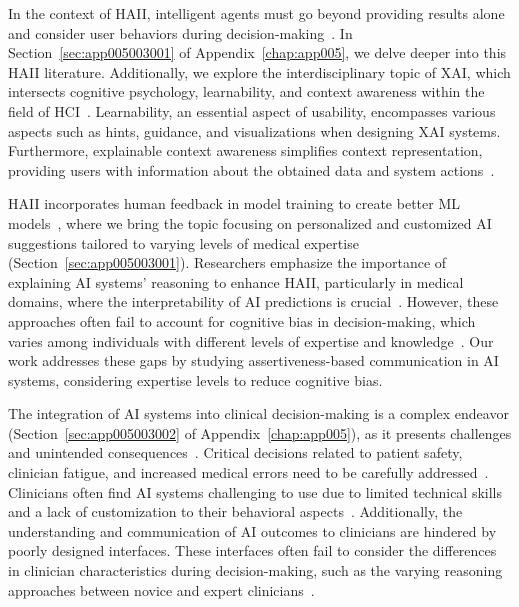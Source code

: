 In the context of \ac{HAII}, intelligent agents must go beyond providing results alone and consider user behaviors during decision-making~\cite{10.1145/3313831.3376807}.
In Section~\ref{sec:app005003001} of Appendix~\ref{chap:app005}, we delve deeper into this \ac{HAII} literature.
Additionally, we explore the interdisciplinary topic of \ac{XAI}, which intersects cognitive psychology, learnability, and context awareness within the field of \ac{HCI}~\cite{doi:10.1073/pnas.1618211113}.
Learnability, an essential aspect of usability, encompasses various aspects such as hints, guidance, and visualizations when designing \ac{XAI} systems\cite{10.1145/3173574.3174156}.
Furthermore, explainable context awareness simplifies context representation, providing users with information about the obtained data and system actions~\cite{10.1145/3313831.3376545}.

\ac{HAII} incorporates human feedback in model training to create better \ac{ML} models~\cite{10.1145/3290605.3300233, 10.1145/3132272.3134111, Kocielnik:2019:YAI:3290605.3300641, aha2017ai}, where we bring the topic focusing on personalized and customized \ac{AI} suggestions tailored to varying levels of medical expertise (Section~\ref{sec:app005003001}).
Researchers emphasize the importance of explaining \ac{AI} systems' reasoning to enhance \ac{HAII}, particularly in medical domains, where the interpretability of \ac{AI} predictions is crucial~\cite{10.1145/3411764.3445717, Rudin2022, Kawamleh2022}.
However, these approaches often fail to account for cognitive bias in decision-making, which varies among individuals with different levels of expertise and knowledge~\cite{https://doi.org/10.1111/nuf.12430, Seidel2021}.
Our work addresses these gaps by studying assertiveness-based communication in \ac{AI} systems, considering expertise levels to reduce cognitive bias.

The integration of \ac{AI} systems into clinical decision-making is a complex endeavor (Section~\ref{sec:app005003002} of Appendix~\ref{chap:app005}), as it presents challenges and unintended consequences~\cite{miller2019intrinsically}.
Critical decisions related to patient safety, clinician fatigue, and increased medical errors need to be carefully addressed~\cite{10.1093/jamia/ocab291, 10.1117/12.2613082, doi:10.1148/radiol.212631}.
Clinicians often find \ac{AI} systems challenging to use due to limited technical skills and a lack of customization to their behavioral aspects~\cite{CALISTO2022102922}.
Additionally, the understanding and communication of \ac{AI} outcomes to clinicians are hindered by poorly designed interfaces.
These interfaces often fail to consider the differences in clinician characteristics during decision-making, such as the varying reasoning approaches between novice and expert clinicians~\cite{Edgar2022}.

